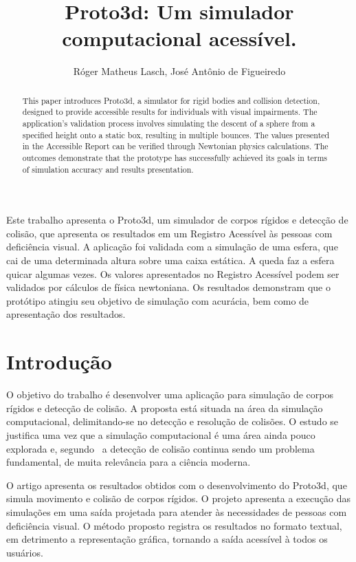 \documentclass[12pt]{article}
\title{Proto3d: Um simulador computacional acessível.}
\author{Róger Matheus Lasch\inst{1}, José Antônio de Figueiredo\inst{1}}
\begin{document}
 

\maketitle

\begin{abstract}
This paper introduces Proto3d, a simulator for rigid bodies and collision detection, designed to provide accessible results for individuals with visual impairments. The application's validation process involves simulating the descent of a sphere from a specified height onto a static box, resulting in multiple bounces. The values presented in the Accessible Report can be verified through Newtonian physics calculations. The outcomes demonstrate that the prototype has successfully achieved its goals in terms of simulation accuracy and results presentation.
\end{abstract}
     
\begin{resumo} 
Este trabalho apresenta o Proto3d, um simulador de corpos rígidos e detecção de colisão, que apresenta os resultados em um Registro Acessível às pessoas com deficiência visual. A aplicação foi validada com a simulação de uma esfera, que cai de uma determinada altura sobre uma caixa estática. A queda faz a esfera quicar algumas vezes. Os valores apresentados no Registro Acessível podem ser validados por cálculos de física newtoniana. Os resultados demonstram que o protótipo atingiu seu objetivo de simulação com acurácia, bem como de apresentação dos resultados.
\end{resumo}

\section{Introdução}
O objetivo do trabalho é desenvolver uma aplicação para simulação de corpos rígidos e detecção de colisão. A proposta está situada na área da simulação computacional, delimitando-se no detecção e resolução de colisões. O estudo se justifica uma vez que a simulação computacional é uma área ainda pouco explorada e, segundo~\cite{ericson2004real} a detecção de colisão continua sendo um problema fundamental, de muita relevância para a ciência moderna.

O artigo apresenta os resultados obtidos com o desenvolvimento do Proto3d, que simula movimento e colisão de corpos rígidos. O projeto apresenta a execução das simulações em uma saída projetada para atender às necessidades de pessoas com deficiência visual. O método proposto registra os resultados no formato textual, em detrimento a representação gráfica, tornando a saída acessível à todos os usuários.
\end{document}
